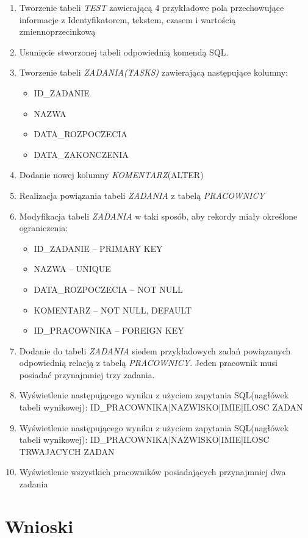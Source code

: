 \documentclass{article}
\begin{document}
\begin{enumerate}
\item Tworzenie tabeli \emph{TEST} zawierającą 4 przykładowe pola przechowujące informacje z Identyfikatorem, tekstem, czasem i wartością zmiennoprzecinkową

\item Usunięcie stworzonej tabeli odpowiednią komendą SQL.

\item Tworzenie tabeli \emph{ZADANIA(TASKS)} zawierającą następujące kolumny:
\begin{itemize}
\item ID\_ZADANIE
\item NAZWA
\item DATA\_ROZPOCZECIA
\item DATA\_ZAKONCZENIA
\end{itemize}

\item Dodanie nowej kolumny \emph{KOMENTARZ}(ALTER)

\item Realizacja powiązania tabeli \emph{ZADANIA} z tabelą \emph{PRACOWNICY}

\item Modyfikacja tabeli \emph{ZADANIA} w taki sposób, aby rekordy miały określone ograniczenia:
\begin{itemize}
\item ID\_ZADANIE -- PRIMARY KEY
\item NAZWA -- UNIQUE
\item DATA\_ROZPOCZECIA -- NOT NULL
\item KOMENTARZ -- NOT NULL, DEFAULT
\item ID\_PRACOWNIKA -- FOREIGN KEY
\end{itemize}

\item Dodanie do tabeli \emph{ZADANIA} siedem przykładowych zadań powiązanych odpowiednią relacją z tabelą \emph{PRACOWNICY}. Jeden pracownik musi posiadać przynajmniej trzy zadania.

\item Wyświetlenie następującego wyniku z użyciem zapytania SQL(nagłówek tabeli wynikowej): ID\_PRACOWNIKA|NAZWISKO|IMIE|ILOSC ZADAN

\item Wyświetlenie następującego wyniku z użyciem zapytania SQL(nagłówek tabeli wynikowej): ID\_PRACOWNIKA|NAZWISKO|IMIE|ILOSC TRWAJACYCH ZADAN

\item Wyświetlenie wszystkich pracowników posiadających przynajmniej dwa zadania

\end{enumerate}
\section{Wnioski}
\end{document}
